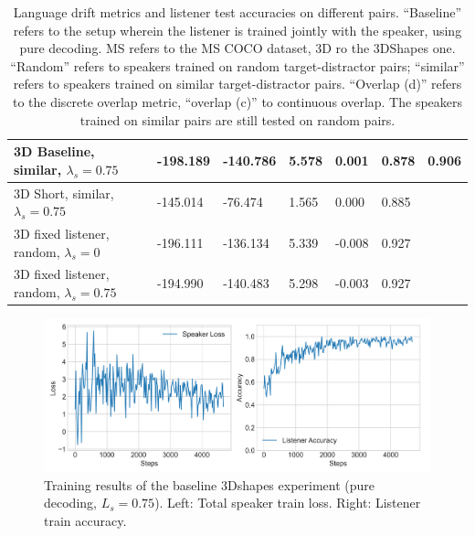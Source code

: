 \begin{table}[]
\begin{tabularx}{\textwidth}{|X|l|l|X|X|X|X|}
		3D Baseline, similar, $\lambda_s = 0.75$ &      -198.189             &       -140.786                 &           5.578           &        0.001              & 0.878                      &            0.906                        \\ \hline
		3D Short, similar, $\lambda_s = 0.75$&      -145.014             &      -76.474                  &             1.565         &         0.000             &                   0.885                       &                                           \\ \hline
		3D fixed listener, random, $\lambda_s = 0$&      -196.111          &     -136.134                  &             5.339         &         -0.008            &                   0.927                      &                                           \\ \hline
		3D fixed listener, random, $\lambda_s = 0.75$&      -194.990          &     -140.483                  &             5.298         &         -0.003            &                   0.927                      &                                           \\ \hline
	\end{tabularx}
	\caption{\label{tab:3dshapes_drift_metrics_basic} Language drift metrics and listener test accuracies on different pairs. 
		``Baseline'' refers to the setup wherein the listener is trained jointly with the speaker, using pure decoding. MS refers to the MS COCO dataset, 3D ro the 3DShapes one. ``Random'' refers to speakers trained on random target-distractor pairs; ``similar'' refers to speakers trained on similar target-distractor pairs. ``Overlap (d)'' refers to the discrete overlap metric, ``overlap (c)'' to continuous overlap. The speakers trained on similar pairs are still tested on random pairs.}
\end{table}

\begin{figure}
	\centering
	\includegraphics[width=\linewidth]{images/3dshapes_refgame_49_pure_075.png}
	\caption{Training results of the baseline 3Dshapes experiment (pure decoding, $L_s = 0.75$). Left: Total speaker train loss. Right: Listener train accuracy.}
	\label{fig:3dshapes_baseline_075_speaker_loss_listener_acc}
\end{figure}



